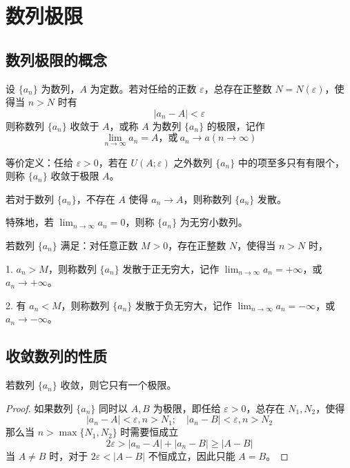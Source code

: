 \chapter{数列极限}

\section{数列极限的概念}

\begin{definition}
	设 $\{a_n\}$ 为数列，$A$ 为定数。若对任给的正数 $\varepsilon$，总存在正整数 $N=N(\varepsilon)$，使得当 $n>N$ 时有
	$$|a_n - A| < \varepsilon$$
	则称数列 $\{a_n\}$ 收敛于 $A$，或称 $A$ 为数列 $\{a_n\}$ 的极限，记作
	$$\displaystyle\lim_{n\to \infty} a_n = A \text{，或}\ a_n \to a(n \to \infty)$$
\end{definition}

等价定义：任给 $\varepsilon > 0$，若在 $U(A;\varepsilon)$ 之外数列 $\{a_n\}$ 中的项至多只有有限个，则称 $\{a_n\}$ 收敛于极限 $A$。

若对于数列 $\{a_n\}$，不存在 $A$ 使得 $a_n\to A$，则称数列 $\{a_n\}$ 发散。

特殊地，若 $\displaystyle\lim_{n\to \infty} a_n = 0$，则称 $\{a_n\}$ 为无穷小数列。

\begin{definition}[无穷大数列]
	若数列 $\{a_n\}$ 满足：对任意正数 $M>0$，存在正整数 $N$，使得当 $n>N$ 时，

	1. $a_n>M$，则称数列 $\{a_n\}$ 发散于正无穷大，记作 $\displaystyle\lim_{n\to \infty} a_n = +\infty$，或 $a_n \to +\infty$。

	2. 有 $a_n<M$，则称数列 $\{a_n\}$ 发散于负无穷大，记作 $\displaystyle\lim_{n\to \infty} a_n = -\infty$，或 $a_n \to -\infty$。
\end{definition}

\section{收敛数列的性质}

\begin{theorem}[唯一性]
	若数列 $\{a_n\}$ 收敛，则它只有一个极限。
\end{theorem}

\begin{proof}
	如果数列 $\{a_n\}$ 同时以 $A,B$ 为极限，即任给 $\varepsilon>0$，总存在 $N_1,N_2$，使得
	$$|a_n-A|<\varepsilon,n>N_1;\quad |a_n-B|<\varepsilon,n>N_2$$
	那么当 $n>\max\{N_1,N_2\}$ 时需要恒成立
	$$2\varepsilon > |a_n-A|+|a_n-B| \geqslant |A-B|$$
	当 $A\ne B$ 时，对于 $2\varepsilon <|A-B|$ 不恒成立，因此只能 $A=B$。
\end{proof}

